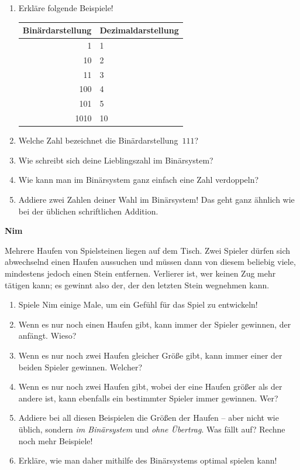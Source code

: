 \documentclass[a4paper,ngerman,14pt]{scrartcl}
\newcommand{\header}[1]{\begin{center}
  \Huge\textbf{\textsf{#1}}
\end{center}}
\begin{document}
\begin{enumerate}
\item Erkläre folgende Beispiele!

\begin{center}
\begin{tabular}{r|l}
  Binärdarstellung & Dezimaldarstellung \\\hline
  1 & 1 \\
  10 & 2 \\
  11 & 3 \\
  100 & 4 \\
  101 & 5 \\
  1010 & 10
\end{tabular}
\end{center}

\item Welche Zahl bezeichnet die Binärdarstellung~$111$?
\item Wie schreibt sich deine Lieblingszahl im Binärsystem?
\item Wie kann man im Binärsystem ganz einfach eine Zahl verdoppeln?
\item Addiere zwei Zahlen deiner Wahl im Binärsystem! Das geht ganz ähnlich wie
bei der üblichen schriftlichen Addition.
\end{enumerate}

\newpage

\header{Nim}

Mehrere Haufen von Spielsteinen liegen auf dem Tisch. Zwei Spieler dürfen
sich abwechselnd einen Haufen aussuchen und müssen dann von diesem beliebig viele,
mindestens jedoch einen Stein entfernen. Verlierer ist, wer keinen Zug mehr
tätigen kann; es gewinnt also der, der den letzten Stein wegnehmen kann.

\begin{enumerate}
\item Spiele Nim einige Male, um ein Gefühl für das Spiel zu entwickeln!
\item Wenn es nur noch einen Haufen gibt, kann immer der Spieler gewinnen, der
anfängt. Wieso?
\item Wenn es nur noch zwei Haufen gleicher Größe gibt, kann immer einer der
beiden Spieler gewinnen. Welcher?
\item Wenn es nur noch zwei Haufen gibt, wobei der eine Haufen größer als der
andere ist, kann ebenfalls ein bestimmter Spieler immer gewinnen. Wer?
\item Addiere bei all diesen Beispielen die Größen der
Haufen -- aber nicht wie üblich, sondern \emph{im Binärsystem} und \emph{ohne
Übertrag}. Was fällt auf? Rechne noch mehr Beispiele!
\item Erkläre, wie man daher mithilfe des Binärsystems optimal spielen kann!
\end{enumerate}
\end{document}
